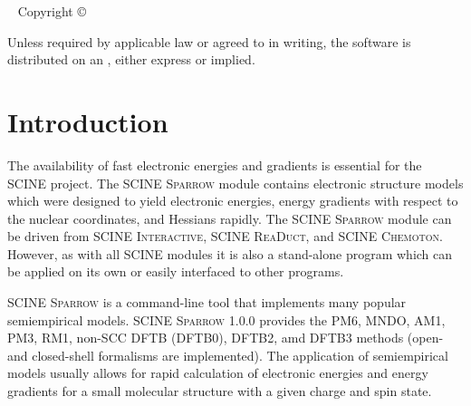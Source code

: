 \documentclass[]{tufte-book}
\title[SCINE Sparrow manual]{User Manual \vskip 0.5em {\setlength{\parindent}{0pt} \Huge SCINE Sparrow 1.0.0}}
\author[The SCINE Sparrow Developers]{The SCINE Sparrow Developers: \newline \noindent Francesco Bosia, Tamara Husch, Alain Vaucher, and Markus Reiher}
\newcommand{\monthyear}{%
  \ifcase\month\or January\or February\or March\or April\or May\or June\or
  July\or August\or September\or October\or November\or
  December\fi\space\number\year
}
\begin{document}
\setlength{\parindent}{0pt}

\frontmatter


\maketitle


\newpage
\begin{fullwidth}
~\vfill
\thispagestyle{empty}
\setlength{\parindent}{0pt}
\setlength{\parskip}{\baselineskip}
Copyright \copyright\ \the\year\ \thanklessauthor


\par{}

\par Unless required by applicable law or agreed to in writing, the software 
is distributed on an , either express or implied. 

\end{fullwidth}

\tableofcontents




\mainmatter

\let\cleardoublepage\clearpage
\chapter{Introduction}

The availability of fast electronic energies and gradients is essential for the SCINE project. The SCINE \textsc{Sparrow} 
module contains electronic structure models which were designed to yield electronic energies, energy gradients with 
respect to the nuclear coordinates, and Hessians rapidly. The SCINE \textsc{Sparrow} module can be driven from SCINE 
\textsc{Interactive}, SCINE \textsc{ReaDuct}, and SCINE \textsc{Chemoton}. However, as with all SCINE modules it is also 
a stand-alone program which can be applied on its own or easily interfaced to other programs.

SCINE \textsc{Sparrow} is a command-line tool that implements many popular semiempirical models. SCINE \textsc{Sparrow} 1.0.0 
provides the PM6, MNDO, AM1, PM3, RM1, non-SCC DFTB (DFTB0), DFTB2, amd DFTB3 methods (open- and closed-shell formalisms are implemented). 
The application of semiempirical models usually allows for rapid calculation of electronic energies and energy gradients 
for a small molecular structure with a given charge and spin state.
\end{document}
